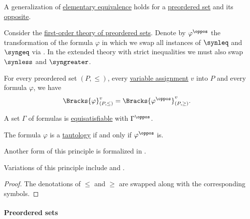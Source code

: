 \begin{theorem}\label{thm:order_duality}
  A generalization of \hyperref[def:elementary_equivalence]{elementary equivalence} holds for a \hyperref[def:preordered_set]{preordered set} and its \hyperref[def:partially_ordered_set/opposite]{opposite}.

  Consider the \hyperref[def:partially_ordered_set/theory]{first-order theory of preordered sets}. Denote by \( \varphi^\oppos \) the transformation of the formula \( \varphi \) in which we swap all instances of \( \synleq \) and \( \syngeq \) via . In the extended theory with strict inequalities we must also swap \( \synless \) and \( \syngreater \).

  \begin{thmenum}
     For every preordered set \( (P, \leq) \), every \hyperref[def:fol_variable_assignment]{variable assignment} \( v \) into \( P \) and every formula \( \varphi \), we have
    \begin{equation*}
      \Bracks{\varphi}_{(P, \leq)}^v = \Bracks{\varphi^\oppos}_{(P, \geq)}^v.
    \end{equation*}

     A set \( \Gamma \) of formulas is \hyperref[def:equisatisfiability]{equisatisfiable} with \( \Gamma^\oppos \).

     The formula \( \varphi \) is a \hyperref[def:fol_semantics/tautology]{tautology} if and only if \( \varphi^\oppos \) is.
  \end{thmenum}
\end{theorem}
\begin{comments}
  \item Another form of this principle is formalized in .

  \item Variations of this principle include  and .
\end{comments}
\begin{proof}
  The denotations of \( \leq \) and \( \geq \) are swapped along with the corresponding symbols.
\end{proof}

\paragraph{Preordered sets}

